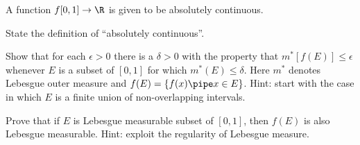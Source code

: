 A function $f[0,1]\rightarrow \R$ is given to be absolutely
continuous.
\begin{alist}
\item State the definition of ``absolutely continuous''.
\item Show that for each $\epsilon>0$ there is a $\delta>0$ with
the property that $m^*[f(E)]\leq \epsilon$ whenever $E$ is a subset of
$[0,1]$ for which $m^*(E)\leq \delta$. Here $m^*$ denotes Lebesgue
outer measure and $f(E)=\{f(x)\pipe x\in E\}$. Hint: start with the
case in which $E$ is a finite union of non-overlapping intervals.
\item Prove that if $E$ is Lebesgue measurable subset of $[0,1]$, then 
$f(E)$ is also Lebesgue measurable. Hint: exploit the regularity of
Lebesgue measure.
\end{alist}
